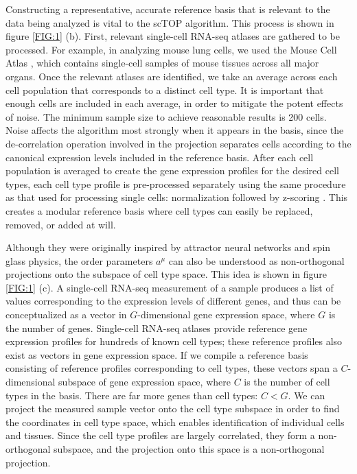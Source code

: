 \documentclass[aps,superscriptaddress, notitlepage,longbibliography]{revtex4-1}
\begin{document}
Constructing a representative, accurate reference basis that is relevant to the data being analyzed is vital to the scTOP algorithm. This process is shown in figure \ref{FIG:1} (b). First, relevant single-cell RNA-seq atlases are gathered to be processed. For example, in analyzing mouse lung cells, we used the Mouse Cell Atlas \cite{noauthor_mapping_nodate}, which contains single-cell samples of mouse tissues across all major organs. Once the relevant atlases are identified, we take an average across each cell population that corresponds to a distinct cell type. It is important that enough cells are included in each average, in order to mitigate the potent effects of noise. The minimum sample size to achieve reasonable results is 200 cells. Noise affects the algorithm most strongly when it appears in the basis, since the de-correlation operation involved in the projection separates cells according to the canonical expression levels included in the reference basis. After each cell population is averaged to create the gene expression profiles for the desired cell types, each cell type profile is pre-processed separately using the same procedure as that used for processing single cells: normalization followed by z-scoring . This creates a modular reference basis where cell types can easily be replaced, removed, or added at will. 

Although they were originally inspired by attractor neural networks and spin glass physics, the order parameters $a^{\mu}$ can also be understood as non-orthogonal projections onto the subspace of cell type space. This idea is shown in figure \ref{FIG:1} (c). A single-cell RNA-seq measurement of a sample produces a list of values corresponding to the expression levels of different genes, and thus can be conceptualized as a vector in $G$-dimensional gene expression space, where $G$ is the number of genes. Single-cell RNA-seq atlases provide reference gene expression profiles for hundreds of known cell types; these reference profiles also exist as vectors in gene expression space. If we compile a reference basis consisting of reference profiles corresponding to cell types, these vectors span a $C$-dimensional subspace of gene expression space, where $C$ is the number of cell types in the basis. There are far more genes than cell types: $C < G$. We can project the measured sample vector onto the cell type subspace in order to find the coordinates in cell type space, which enables identification of individual cells and tissues. Since the cell type profiles are largely correlated, they form a non-orthogonal subspace, and the projection onto this space is a non-orthogonal projection.
\end{document}
